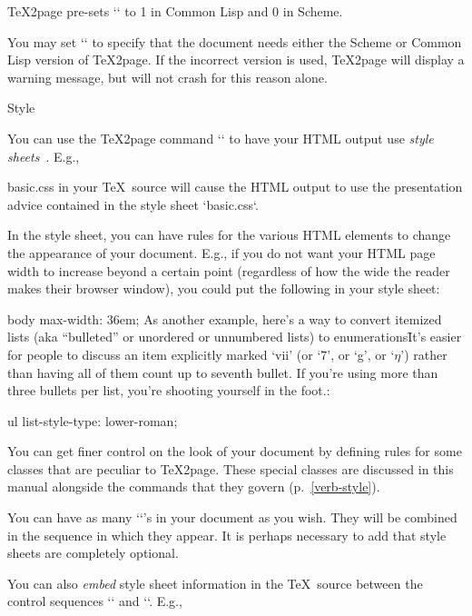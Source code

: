 \TeX2page pre-sets `\TZPcommonlisp` to 1 in Common Lisp and 0 in Scheme.

You may set `\TZPcommonlisp` to specify that the document needs
either the Scheme or Common Lisp version of \TeX2page. If
the incorrect version is used, \TeX2page will display a warning
message, but will not crash for this reason alone.

 Style

%
You can use the \TeX2page command `` to have your HTML output use {\em style
sheets}~\cite{w3c:css,lb:css,htmlhelp:css}.  E.g.,

\begintt
\ifx\shipout\UnDeFiNeD %
   basic.css
\fi
\endtt
%
in your \TeX\ source will cause the HTML output to
use the presentation advice contained in the
style sheet `basic.css`.

In the style sheet, you can have rules for the various
HTML elements to change the appearance of your
document.  E.g., if you do not want your HTML page
width to increase beyond a certain point (regardless of
how the wide the reader makes their browser window),
you could put the following in your style sheet:

\begintt
body {
  max-width: 36em;
}
\endtt
As another example, here’s a way to convert itemized lists (aka
“bulleted” or unordered or unnumbered lists) to
enumerations\f{It’s easier for people to discuss an item
explicitly marked ‘vii’ (or ‘7’, or ‘g’, or ‘$\eta$’) rather than
having all of them count up to seventh bullet. If you’re using
more than three bullets per list, you’re shooting yourself in the
foot.}:

\begintt
ul {
  list-style-type: lower-roman;
}
\endtt

You can get finer control on the look of your document
by defining rules for some classes that are peculiar to
\TeX2page.  These special classes
are discussed in this manual alongside the commands
that they govern (p.~\ref{verb-style}).

You can have as many ``’s in your
document as you wish.  They will be combined in
the sequence in which they appear.  It is perhaps
necessary to add that style sheets are completely
optional.


You can also {\em embed} style sheet information
in the \TeX\ source between the control sequences
`\cssblock` and `\endcssblock`.  E.g.,

